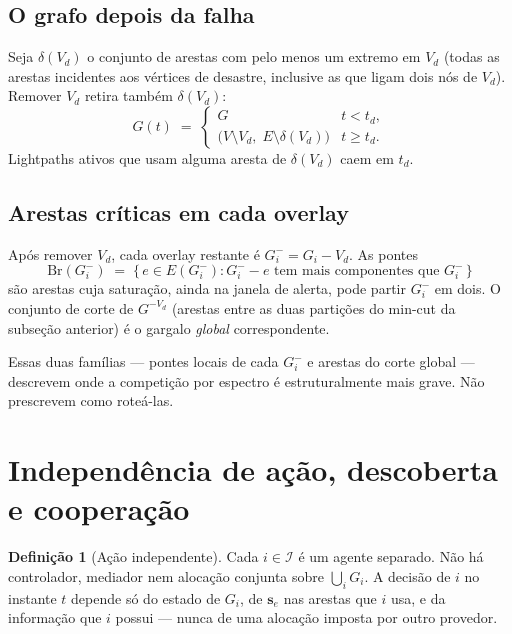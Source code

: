 \documentclass[11pt,a4paper]{article}
\theoremstyle{definition}
\newtheorem{definicao}{Definição}
\begin{document}
\subsection{O grafo depois da falha}

Seja $\delta(V_d)$ o conjunto de arestas com pelo menos um extremo em $V_d$
(todas as arestas incidentes aos vértices de desastre, inclusive as que ligam dois nós de $V_d$).
Remover $V_d$ retira também $\delta(V_d)$:
\begin{equation}
  G(t)
  \;=\;
  \begin{cases}
    G & t<t_d,\\
    \bigl(V\setminus V_d,\; E\setminus\delta(V_d)\bigr) & t\ge t_d.
  \end{cases}
\end{equation}
Lightpaths ativos que usam alguma aresta de $\delta(V_d)$ caem em $t_d$.

\subsection{Arestas críticas em cada overlay}

Após remover $V_d$, cada overlay restante é $G_i^{-}=G_i-V_d$.
As pontes
\begin{equation}
  \mathrm{Br}(G_i^{-})
  \;=\;
  \bigl\{\,e\in E(G_i^{-}):
    G_i^{-}-e\text{ tem mais componentes que }G_i^{-}\,\bigr\}
\end{equation}
são arestas cuja saturação, ainda na janela de alerta, pode partir $G_i^{-}$ em dois.
O conjunto de corte de $G^{-V_d}$ (arestas entre as duas partições do min-cut da subseção anterior) é o gargalo \emph{global} correspondente.

Essas duas famílias --- pontes locais de cada $G_i^{-}$ e arestas do corte global --- descrevem onde a competição por espectro é estruturalmente mais grave.
Não prescrevem como roteá-las.

\section{Independência de ação, descoberta e cooperação}

\begin{definicao}[Ação independente]
Cada $i\in\mathcal{I}$ é um agente separado.
Não há controlador, mediador nem alocação conjunta sobre $\bigcup_i G_i$.
A decisão de $i$ no instante $t$ depende só do estado de $G_i$, de $\mathbf{s}_e$ nas arestas que $i$ usa, e da informação que $i$ possui --- nunca de uma alocação imposta por outro provedor.
\end{definicao}
\end{document}
